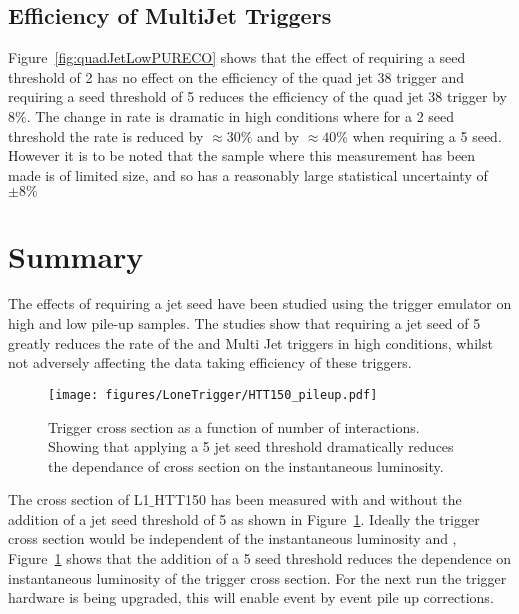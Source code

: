 \subsection{Efficiency of MultiJet Triggers} %
\label{par:Efficiency of MultiJet Triggers}
Figure~\ref{fig:quadJetLowPURECO} shows that the effect of requiring a seed 
threshold of \unit{2}{\GeV} has no effect on the efficiency of the quad jet 
\unit{38}{\GeV} trigger and requiring a seed threshold of \unit{5}{\GeV} 
reduces the efficiency of the quad jet 38 trigger by $8\%$. The change in rate 
is dramatic in high \pu conditions where for a \unit{2}{\GeV} seed 
threshold the rate is reduced by $\approx 30\%$ and by $\approx 40\%$ when 
requiring a \unit{5}{\GeV} seed. However it is to be noted that the sample 
where this measurement has been made is of limited size, and so has a reasonably large statistical uncertainty of $\pm8\%$



\section{Summary} %
\label{sec:Summary}
The effects of requiring a jet seed have been studied using the \Lone trigger 
emulator on high and low pile-up samples. The studies show that requiring a jet 
seed of \unit{5}{\GeV} greatly reduces the rate of the \HT and Multi Jet triggers in high \pu conditions, whilst not adversely affecting the data taking 
efficiency of these triggers.

\begin{figure}[ht]
  \centering
  \texttt{[image: figures/LoneTrigger/HTT150\_pileup.pdf]}
  \caption{Trigger cross section as a function of number of \pu 
  interactions. Showing that applying a \unit{5}{\GeV} jet seed threshold 
  dramatically reduces the dependance of cross section on the instantaneous   
  luminosity.}
  \label{fig:figures_HTT150_pileup}
\end{figure}

The cross section of L1$\_$HTT150 has been measured with and without the 
addition of a jet seed threshold of \unit{5}{\GeV} as shown in  
Figure~\ref{fig:figures_HTT150_pileup}. Ideally the trigger cross section would 
be independent of the instantaneous luminosity and \pu, 
Figure~\ref{fig:figures_HTT150_pileup} shows that the addition of a 
\unit{5}{\GeV} seed threshold reduces the dependence on instantaneous 
luminosity of the trigger cross section. For the next run the \Lone trigger hardware is being upgraded, this will enable event by event pile up corrections.


